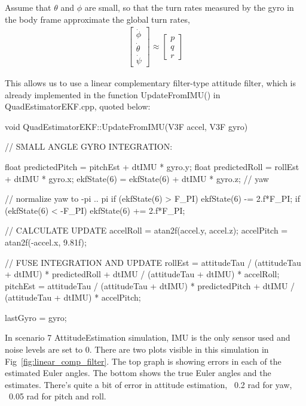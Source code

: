 \documentclass[letterpaper]{article}
\begin{document}
Assume that $\theta$ and $\phi$ are small, so that the turn rates measured by the gyro in the body frame approximate the global turn rates,
\begin{align*}
  \left[\begin{array}{c}\dot{\phi}\\\dot{\theta}\\\dot{\psi}\end{array}\right]
  \approx
  \left[\begin{array}{c}p\\q\\r\end{array}\right]  
\end{align*}

This allows us to use a linear complementary filter-type attitude filter, which is already implemented in the function UpdateFromIMU() in QuadEstimatorEKF.cpp, quoted below:

\begin{CPP}
void QuadEstimatorEKF::UpdateFromIMU(V3F accel, V3F gyro)
{
    // SMALL ANGLE GYRO INTEGRATION:

    float predictedPitch = pitchEst + dtIMU * gyro.y;
    float predictedRoll = rollEst + dtIMU * gyro.x;
    ekfState(6) = ekfState(6) + dtIMU * gyro.z;   // yaw

    // normalize yaw to -pi .. pi
    if (ekfState(6) > F_PI) ekfState(6) -= 2.f*F_PI;
    if (ekfState(6) < -F_PI) ekfState(6) += 2.f*F_PI;

    // CALCULATE UPDATE
    accelRoll = atan2f(accel.y, accel.z);
    accelPitch = atan2f(-accel.x, 9.81f);

    // FUSE INTEGRATION AND UPDATE
    rollEst = attitudeTau / (attitudeTau + dtIMU) * predictedRoll +
                  dtIMU / (attitudeTau + dtIMU) * accelRoll;
    pitchEst = attitudeTau / (attitudeTau + dtIMU) * predictedPitch +
                   dtIMU / (attitudeTau + dtIMU) * accelPitch;

    lastGyro = gyro;
}
\end{CPP}

In scenario 7 AttitudeEstimation simulation, IMU is the only sensor used and noise levels are set to 0. There are two plots visible in this simulation in Fig~\ref{fig:linear_comp_filter}. The top graph is showing errors in each of the estimated Euler angles. The bottom shows the true Euler angles and the estimates. There’s quite a bit of error in attitude estimation, ~0.2 rad for yaw, ~0.05 rad for pitch and roll.
\end{document}
